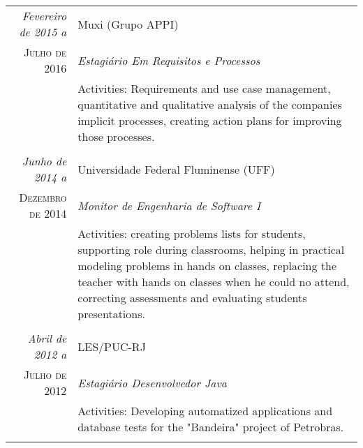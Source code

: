 \documentclass[a4paper,10pt]{article}
\begin{document}
\begin{tabular}{r|p{11cm}}
 \emph{Fevereiro de 2015 a} & Muxi (Grupo APPI) \\
 \textsc{Julho de 2016}&\emph{Estagiário Em Requisitos e Processos}\\
 &\footnotesize{Activities: Requirements and use case management, quantitative and qualitative analysis of the companies implicit processes, creating action plans for improving those processes.}\\
 
 & \\
 
 \emph{Junho de 2014 a} & Universidade Federal Fluminense (UFF) \\
 \textsc{Dezembro de 2014}&\emph{Monitor de Engenharia de Software I}\\
 &\footnotesize{Activities: creating problems lists for students, supporting role during classrooms, helping in practical modeling problems in hands on classes, replacing the teacher with hands on classes when he could no attend, correcting assessments and evaluating students presentations.}\\
 
  & \\
 
 \emph{Abril de 2012 a} & LES/PUC-RJ \\
 \textsc{Julho de 2012}&\emph{Estagiário Desenvolvedor Java}\\
 &\footnotesize{Activities: Developing automatized applications and database tests for the "Bandeira" project of Petrobras.}\\
 
 \multicolumn{2}{c}{} \end{tabular}
 
\end{document}
